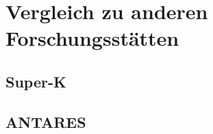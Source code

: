 \chapter{Vergleich zu anderen Forschungsstätten} 
    \vspace{8pt}
    \section{Super-K}
    \section{ANTARES}